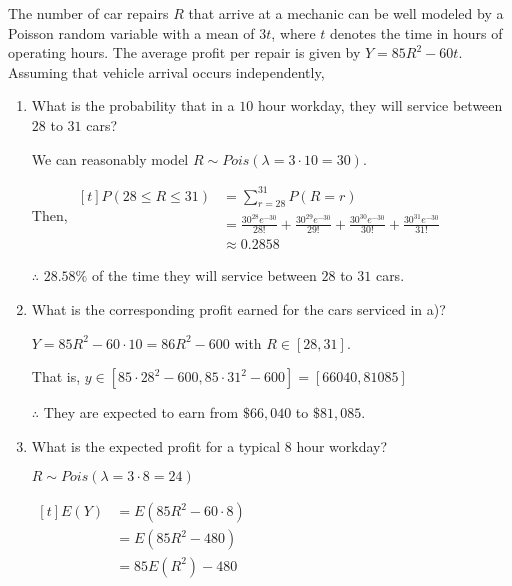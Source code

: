 \begin{example}
    The number of car repairs $R$ that arrive at a mechanic can be well modeled by a Poisson random variable with a mean of $3t$, where $t$ denotes the time in hours of operating hours. The average profit per repair is given by $Y = 85R^2 - 60t$. Assuming that vehicle arrival occurs independently,

    \begin{enumerate}[label=\alph*)]
        \item What is the probability that in a $10$ hour workday, they will service between $28$ to $31$ cars? 

        We can reasonably model $R \sim Pois(\lambda = 3 \cdot 10 = 30)$. 

        Then, $\begin{aligned}[t]
            P(28 \le R \le 31)
             & = \sum_{r=28}^{31} P(R = r)                                                                                             \\
             & = \frac{30^{28} e^{-30}}{28!} + \frac{30^{29} e^{-30}}{29!} + \frac{30^{30} e^{-30}}{30!} + \frac{30^{31} e^{-30}}{31!} \\
             & \approx 0.2858
        \end{aligned}$

        $\therefore$ $28.58\%$ of the time they will service between $28$ to $31$ cars. 

        \item What is the corresponding profit earned for the cars serviced in a)? 

        $Y = 85R^2 - 60 \cdot 10 = 86R^2 - 600$ with $R \in [28, 31]$.

        That is, $y \in [85 \cdot 28^2 - 600, 85 \cdot 31^2 - 600] = [66040, 81085]$

        $\therefore$ They are expected to earn from $\$66,040$ to $\$81,085$. 

        \item What is the expected profit for a typical $8$ hour workday?

        $R \sim Pois(\lambda = 3 \cdot 8 = 24)$
        
        $\begin{aligned}[t]
            E(Y) & = E(85R^2 - 60 \cdot 8) \\
                 & = E(85R^2 - 480) \\
                 & = 85 E(R^2) - 480 \\
        \end{aligned}$


\end{enumerate}
\end{example}
